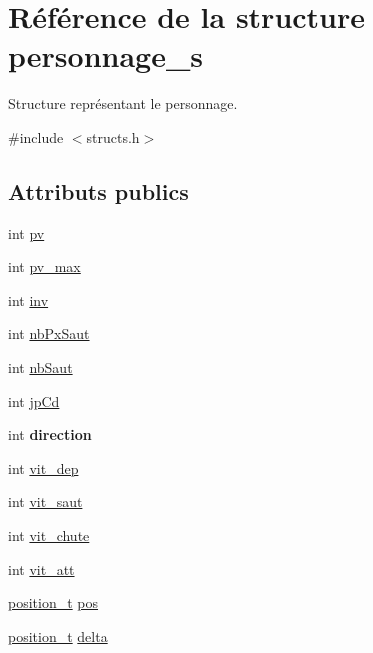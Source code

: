 \hypertarget{structpersonnage__s}{}\section{Référence de la structure personnage\+\_\+s}
\label{structpersonnage__s}


Structure représentant le personnage.  




{\ttfamily \#include $<$structs.\+h$>$}

\subsection*{Attributs publics}
\begin{DoxyCompactItemize}
\item 
int \hyperlink{structpersonnage__s_ab3090d9110756af454516f939e9f8a86}{pv}
\item 
int \hyperlink{structpersonnage__s_a0e58c8761de9044ce770f21aa9ada41a}{pv\+\_\+max}
\item 
int \hyperlink{structpersonnage__s_a1d76a383232b764037a80a8b39b3c378}{inv}
\item 
int \hyperlink{structpersonnage__s_a47e8c34ccb98b49ca57baa55d4326ee3}{nb\+Px\+Saut}
\item 
int \hyperlink{structpersonnage__s_a1b5dac574e8ad57eaa9989699fbfb139}{nb\+Saut}
\item 
int \hyperlink{structpersonnage__s_a05d061a818efa6b7bfa5b3c76ba3b8dd}{jp\+Cd}
\item 
\mbox{\label{structpersonnage__s_a6d6791f61e66ee9ee1125c39bc99f164}} 
int {\bfseries direction}
\item 
int \hyperlink{structpersonnage__s_a6899a0efdc3a3fccb060aaf06b4e4b8d}{vit\+\_\+dep}
\item 
int \hyperlink{structpersonnage__s_abf199b160e1ce327b7def1ed1ee00b39}{vit\+\_\+saut}
\item 
int \hyperlink{structpersonnage__s_a8e340f828bfffa2c47269e315609ed01}{vit\+\_\+chute}
\item 
int \hyperlink{structpersonnage__s_a0022973bab638a02774a19710cedcd17}{vit\+\_\+att}
\item 
\hyperlink{structposition__s}{position\+\_\+t} \hyperlink{structpersonnage__s_adea4789f8b55587ec092f3a32b7b1964}{pos}
\item 
\hyperlink{structposition__s}{position\+\_\+t} \hyperlink{structpersonnage__s_a09fb83af37953227050f9ced0410f032}{delta}

\end{DoxyCompactItemize}
